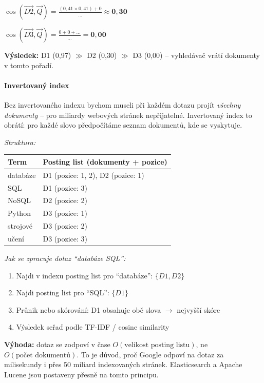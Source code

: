 $\cos(\vec{D2}, \vec{Q}) = \frac{(0{,}41 \times 0{,}41) + 0}{\ldots} \approx \mathbf{0{,}30}$

$\cos(\vec{D3}, \vec{Q}) = \frac{0 + 0 + \ldots}{\ldots} = \mathbf{0{,}00}$

\textbf{Výsledek:} D1 (0{,}97) $\gg$ D2 (0{,}30) $\gg$ D3 (0{,}00) -- vyhledávač vrátí dokumenty v tomto pořadí.

\paragraph{Invertovaný index}

Bez invertovaného indexu bychom museli při každém dotazu projít \textit{všechny dokumenty} --
pro miliardy webových stránek nepřijatelné. Invertovaný index to obrátí: pro každé slovo
předpočítáme seznam dokumentů, kde se vyskytuje.

\textit{Struktura:}
\begin{center}\footnotesize
\begin{tabular}{ll}
\toprule
\textbf{Term} & \textbf{Posting list} (dokumenty + pozice) \\
\midrule
databáze & D1 (pozice: 1, 2), D2 (pozice: 1) \\
SQL      & D1 (pozice: 3) \\
NoSQL    & D2 (pozice: 2) \\
Python   & D3 (pozice: 1) \\
strojové & D3 (pozice: 2) \\
učení    & D3 (pozice: 3) \\
\bottomrule
\end{tabular}
\end{center}

\textit{Jak se zpracuje dotaz ``databáze SQL'':}
\begin{enumerate}
  \item Najdi v indexu posting list pro ``databáze'': $\{D1, D2\}$
  \item Najdi posting list pro ``SQL'': $\{D1\}$
  \item Průnik nebo skórování: D1 obsahuje obě slova $\to$ nejvyšší skóre
  \item Výsledek seřaď podle TF-IDF / cosine similarity
\end{enumerate}

\textbf{Výhoda:} dotaz se zodpoví v čase $O(\text{velikost posting listu})$, ne $O(\text{počet dokumentů})$.
To je důvod, proč Google odpoví na dotaz za milisekundy i přes 50 miliard indexovaných stránek.
Elasticsearch a Apache Lucene jsou postaveny přesně na tomto principu.

